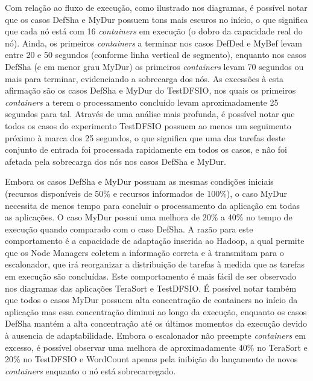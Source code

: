 Com relação ao fluxo de execução, como ilustrado nos diagramas, é possível notar que os casos DefSha e MyDur possuem tons mais escuros no início, o que significa que cada nó está com 16 \textit{containers} em execução (o dobro da capacidade real do nó). Ainda, os primeiros \textit{containers} a terminar nos casos DefDed e MyBef levam entre 20 e 50 segundos (conforme linha vertical de segmento), enquanto nos casos DefSha (e em menor grau MyDur) os primeiros \textit{containers} levam 70 segundos ou mais para terminar, evidenciando a sobrecarga dos nós. As excessões à esta afirmação são os casos DefSha e MyDur do TestDFSIO, nos quais os primeiros \textit{containers} a terem o processamento concluído levam aproximadamente 25 segundos para tal. Através de uma análise mais profunda, é possível notar que todos os casos do experimento TestDFSIO possuem ao menos um seguimento próximo à marca dos 25 segundos, o que significa que uma das tarefas deste conjunto de entrada foi processada rapidamente em todos os casos, e não foi afetada pela sobrecarga dos nós nos casos DefSha e MyDur.

Embora os casos DefSha e MyDur possuam as mesmas condições iniciais (recursos disponíveis de 50\% e recursos informados de 100\%), o caso MyDur necessita de menos tempo para concluir o processamento da aplicação em todas as aplicações. O caso MyDur possui uma melhora de 20\% a 40\% no tempo de execução quando comparado com o caso DefSha. A razão para este comportamento é a capacidade de adaptação inserida ao Hadoop, a qual permite que os Node Managers coletem a informação correta e à transmitam para o escalonador, que irá reorganizar a distribuição de tarefas à medida que as tarefas em execução são concluídas. Este comportamento é mais fácil de ser observado nos diagramas das aplicações TeraSort e TestDFSIO. É possível notar também que todos o casos MyDur possuem alta concentração de containers no início da aplicação mas essa concentração diminui ao longo da execução, enquanto os casos DefSha mantém a alta concentração até os últimos momentos da execução devido à ausencia de adaptabilidade. Embora o escalonador não preempte \textit{containers} em excesso, é possível observar uma melhora de aproximadamente 40\% no TeraSort e 20\% no TestDFSIO e WordCount apenas pela inibição do lançamento de novos \textit{containers} enquanto o nó está sobrecarregado.



